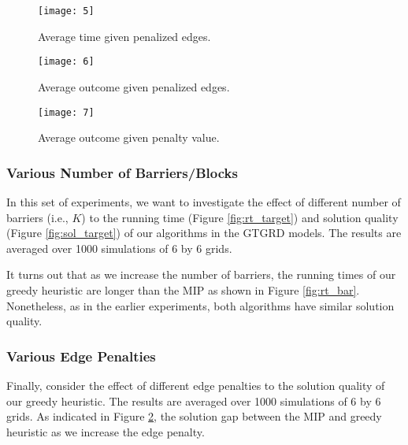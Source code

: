 \begin{figure}[!ht]
\begin{center}
\begin{minipage}{0.48\linewidth}
\texttt{[image: 5]}
\caption{Average time given penalized edges.}
\label{fig:rt_bar}
\end{minipage}%
\hfill
\begin{minipage}{0.49\linewidth}
\texttt{[image: 6]}
\caption{Average outcome given penalized edges.}
\label{fig:sol_bar}
\end{minipage}
\end{center}
\end{figure}

\begin{figure}[!ht]
\begin{center}	
\texttt{[image: 7]}
\caption{Average outcome given penalty value.}
\label{fig:sol_ep}
\end{center}
\end{figure}

\subsubsection{Various Number of Barriers/Blocks}
In this set of experiments, we want to investigate 
the effect of different number of barriers (i.e., $K$) 
to the running time (Figure \ref{fig:rt_target}) 
and solution quality (Figure \ref{fig:sol_target}) of our algorithms 
in the GTGRD models.  
The results are averaged over 1000 simulations of 6 by 6 grids. 


It turns out that as we increase the number of barriers, 
the running times of our greedy heuristic are longer than 
the MIP as shown in Figure \ref{fig:rt_bar}. 
Nonetheless, as in the earlier experiments, 
both algorithms have similar solution quality. 


\subsubsection{Various Edge Penalties}
Finally, consider the effect of different edge penalties 
to the solution quality of our greedy heuristic. 
The results are averaged over 1000 simulations of 6 by 6 grids. 
As indicated in Figure \ref{fig:sol_ep}, 
the solution gap between the MIP and greedy heuristic 
as we increase the edge penalty. 



\nocite{Dijkstra80}
\nocite{plop03-paper}
